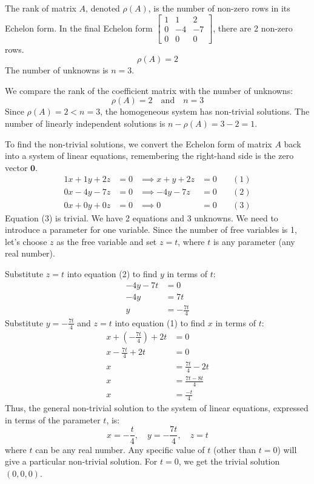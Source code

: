 \documentclass{article}
\begin{document}
The rank of matrix $A$, denoted $\rho(A)$, is the number of non-zero rows in its Echelon form. In the final Echelon form $\begin{bmatrix} 1 & 1 & 2 \\ 0 & -4 & -7 \\ 0 & 0 & 0 \end{bmatrix}$, there are 2 non-zero rows.
\[ \rho(A) = 2 \]
The number of unknowns is $n=3$.

We compare the rank of the coefficient matrix with the number of unknowns:
\[ \rho(A) = 2 \quad \text{and} \quad n = 3 \]
Since $\rho(A) = 2 < n = 3$, the homogeneous system has non-trivial solutions. The number of linearly independent solutions is $n - \rho(A) = 3 - 2 = 1$.

To find the non-trivial solutions, we convert the Echelon form of matrix $A$ back into a system of linear equations, remembering the right-hand side is the zero vector $\mathbf{0}$.
\begin{align*} 1x + 1y + 2z &= 0 &\implies x + y + 2z &= 0 \quad &(1) \\ 0x - 4y - 7z &= 0 &\implies -4y - 7z &= 0 \quad &(2) \\ 0x + 0y + 0z &= 0 &\implies 0 &= 0 \quad &(3) \end{align*}
Equation (3) is trivial. We have 2 equations and 3 unknowns. We need to introduce a parameter for one variable. Since the number of free variables is 1, let's choose $z$ as the free variable and set $z=t$, where $t$ is any parameter (any real number).

Substitute $z=t$ into equation (2) to find $y$ in terms of $t$:
\begin{align*} -4y - 7t &= 0 \\ -4y &= 7t \\ y &= -\frac{7t}{4} \end{align*}
Substitute $y = -\frac{7t}{4}$ and $z=t$ into equation (1) to find $x$ in terms of $t$:
\begin{align*} x + \left(-\frac{7t}{4}\right) + 2t &= 0 \\ x - \frac{7t}{4} + 2t &= 0 \\ x &= \frac{7t}{4} - 2t \\ x &= \frac{7t - 8t}{4} \\ x &= \frac{-t}{4} \end{align*}
Thus, the general non-trivial solution to the system of linear equations, expressed in terms of the parameter $t$, is:
\[ x = -\frac{t}{4}, \quad y = -\frac{7t}{4}, \quad z = t \]
where $t$ can be any real number. Any specific value of $t$ (other than $t=0$) will give a particular non-trivial solution. For $t=0$, we get the trivial solution $(0, 0, 0)$.
\end{document}
